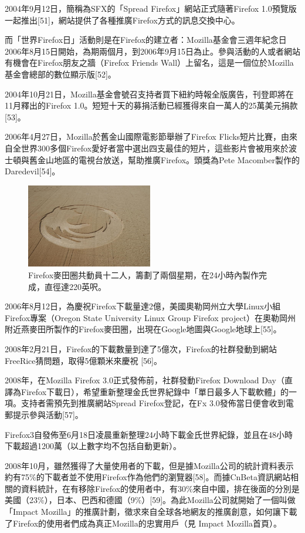 \documentclass[12pt]{article}
\begin{document}
2004年9月12日，簡稱為SFX的「Spread Firefox」網站正式隨著Firefox 1.0預覽版一起推出[51]，網站提供了各種推廣Firefox方式的訊息交換中心。

而「世界Firefox日」活動則是在Firefox的建立者：Mozilla基金會三週年紀念日2006年8月15日開始，為期兩個月，到2006年9月15日為止。參與活動的人或者網站有機會在Firefox朋友之牆（Firefox Friends Wall）上留名，這是一個位於Mozilla基金會總部的數位顯示版[52]。

2004年10月21日，Mozilla基金會號召支持者買下紐約時報全版廣告，刊登即將在11月釋出的Firefox 1.0。短短十天的募捐活動已經獲得來自一萬人的25萬美元捐款[53]。

2006年4月27日，Mozilla於舊金山國際電影節舉辦了Firefox Flicks短片比賽，由來自全世界300多個Firefox愛好者當中選出四支最佳的短片，這些影片會被用來於波士頓與舊金山地區的電視台放送，幫助推廣Firefox。頭獎為Pete Macomber製作的Daredevil[54]。

\begin{figure}
  \begin{center}
    \includegraphics[width=55mm]{Firefox_Crop_Circle}
  \end{center}
  \caption{Firefox麥田圈共動員十二人，籌劃了兩個星期，在24小時內製作完成，直徑達220英呎。}
\end{figure}

2006年8月12日，為慶祝Firefox下載量達2億，美國奧勒岡州立大學Linux小組Firefox專案（Oregon State University Linux Group Firefox project）在奧勒岡州附近燕麥田所製作的Firefox麥田圈，出現在Google地圖與Google地球上[55]。

2008年2月21日，Firefox的下載數量到達了5億次，Firefox的社群發動到網站FreeRice猜問題，取得5億顆米來慶祝 [56]。

2008年，在Mozilla Firefox 3.0正式發佈前，社群發動Firefox Download Day（直譯為Firefox下載日），希望重新整理金氏世界紀錄中「單日最多人下載軟體」的一項。支持者需預先到推廣網站Spread Firefox登記，在Fx 3.0發佈當日便會收到電郵提示參與活動[57]。

Firefox3自發佈至6月18日凌晨重新整理24小時下載金氏世界紀錄，並且在48小時下載超過1200萬（以上數字均不包括自動更新）。

2008年10月，雖然獲得了大量使用者的下載，但是據Mozilla公司的統計資料表示約有75\%的下載者並不使用Firefox作為他們的瀏覽器[58]。而據CnBeta資訊網站相關的資料統計，在有移除Firefox的使用者中，有30\%來自中國，排在後面的分別是美國（23\%），日本、巴西和德國（9\%）[59]。為此Mozilla公司就開始了一個叫做「Impact Mozilla」的推廣計劃，徵求來自全球各地網友的推廣創意，如何讓下載了Firefox的使用者們成為真正Mozilla的忠實用戶（見 Impact Mozilla首頁）。
\end{document}
